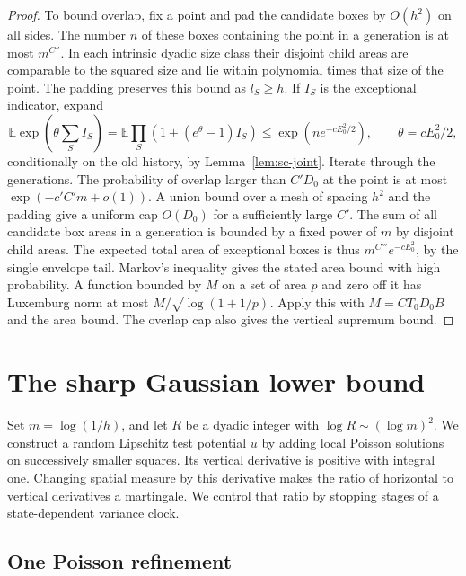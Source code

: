 \documentclass[11pt]{article}
\newcommand{\1}{\mathbf{1}}
\numberwithin{equation}{section}
\newcommand{\E}{\mathbb E}
\begin{document}
\begin{proof}
To bound overlap, fix a point and pad the candidate
boxes by \(O(h^2)\) on all sides. The number \(n\) of
these boxes containing the point in a generation is at
most \(m^{C''}\). In each intrinsic dyadic size class their
disjoint child areas are comparable to the squared size
and lie within polynomial times that size of the point.
The padding preserves this bound as \(l_S\ge h\).
If \(I_S\) is the exceptional indicator, expand
\[
 \E\exp\!\left(\theta\sum_S I_S\right)
 =\E\prod_S(1+(e^\theta-1)I_S)
 \le \exp(ne^{-cE_0^2/2}),\qquad
 \theta=cE_0^2/2,
\]
conditionally on the old history, by Lemma~\ref{lem:sc-joint}.
Iterate through the generations. The probability of overlap
larger than \(C'D_0\) at the point is at most
\(\exp(-c'C'm+o(1))\). A union bound over a mesh of
spacing \(h^2\) and the padding give a uniform cap
\(O(D_0)\) for a sufficiently large \(C'\).
The sum of all candidate box areas in a generation
is bounded by a fixed power of \(m\) by disjoint
child areas. The expected total area of exceptional
boxes is thus \(m^{C'''}e^{-cE_0^2}\), by the single
envelope tail. Markov's inequality gives the stated
area bound with high probability. A function bounded by
\(M\) on a set of area \(p\) and zero off it has Luxemburg
norm at most \(M/\sqrt{\log(1+1/p)}\). Apply this with
\(M=CT_0 D_0 B\) and the area bound. The overlap cap
also gives the vertical supremum bound.
\end{proof}

\section{The sharp Gaussian lower bound}
\label{sec:sharp-constant-lower}

Set \(m=\log(1/h)\), and let \(R\) be a dyadic integer with
\(\log R\sim(\log m)^2\). We construct a random Lipschitz test
potential \(u\) by adding local Poisson solutions on successively
smaller squares. Its vertical derivative is positive with integral
one. Changing spatial measure by this derivative makes the ratio of
horizontal to vertical derivatives a martingale. We control that
ratio by stopping stages of a state-dependent variance clock.

\subsection{One Poisson refinement}
\end{document}
